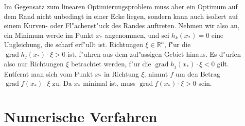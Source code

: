 Im Gegensatz zum linearen Optimierungsproblem muss aber ein
Optimum auf dem Rand nicht unbedingt in einer Ecke liegen,
sondern kann auch isoliert auf einem Kurven- oder Fl"achenst"uck
des Randes auftreten.
Nehmen wir also an, ein Minimum werde im Punkt $x_*$ angenommen,
und sei $h_k(x_*)=0$ eine Ungleichung, die scharf erf"ullt ist.
Richtungen $\xi\in\mathbb R^n$, f"ur die
$\operatorname{grad}h_j(x_*)\cdot\xi > 0$ ist,
f"uhren aus dem zul"assigen Gebiet hinaus. Es d"urfen also nur Richtungen
$\xi$ betrachtet werden, f"ur die $\operatorname{grad}h_j(x_*)\cdot\xi <0$
gilt.
Entfernt man sich vom Punkt $x_*$ in Richtung $\xi$, nimmt $f$
um den Betrag $\operatorname{grad}f(x_*)\cdot \xi$ zu.
Da $x_*$ minimal ist, muss $\operatorname{grad}f(x_*)\cdot\xi >0$
sein.

\section{Numerische Verfahren}
